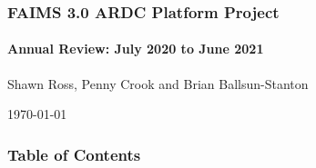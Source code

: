 \documentclass[
	aspectratio=169, %
	11pt, %
	t, %
]{beamer}
\begin{document}

\begin{titleframe} %
	\frametitle{FAIMS 3.0 ARDC Platform Project}
	\framesubtitle{Annual Review: July 2020 to June 2021}

	Shawn Ross, Penny Crook and \newline
	Brian Ballsun-Stanton

	\vfill

 	\today

\end{titleframe}


%


 \begin{frame}
     \frametitle{Table of Contents}

     \begin{columns}[t]
         \begin{column}{0.45\textwidth}
             \tableofcontents[sections={1-3}] %
         \end{column}
         \hfill
         \begin{column}{0.45\textwidth}
             \tableofcontents[sections={4-6}] %
         \end{column}
     \end{columns}
 \end{frame}
\end{document}
